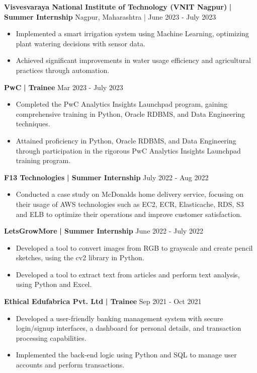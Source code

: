 \documentclass[a4paper]{article}
\begin{document}
      \textbf{Visvesvaraya National Institute of Technology (VNIT Nagpur)}\textbf{ | Summer Internship} \hfill Nagpur, Maharashtra | June 2023 - July 2023\\
          \vspace{-3mm}
\begin{itemize} \itemsep -3pt
\item[] Implemented a smart irrigation system using Machine Learning, optimizing plant watering decisions with sensor data.
\item[] Achieved significant improvements in water usage efficiency and agricultural practices through automation.
\end{itemize}
      \textbf{PwC}\textbf{ | Trainee} \hfill  Mar 2023 - July 2023\\
          \vspace{-3mm}
\begin{itemize} \itemsep -3pt
\item[] Completed the PwC Analytics Insights Launchpad program, gaining comprehensive training in Python, Oracle RDBMS, and Data Engineering techniques.
\item[] Attained proficiency in Python, Oracle RDBMS, and Data Engineering through participation in the rigorous PwC Analytics Insights Launchpad training program.
\end{itemize}
      \textbf{F13 Technologies}\textbf{ | Summer Internship} \hfill  July 2022 - Aug 2022\\
          \vspace{-3mm}
\begin{itemize} \itemsep -3pt
\item[] Conducted a case study on McDonald\textquotesingle{}s home delivery service, focusing on their usage of AWS technologies such as EC2, ECR, Elasticache, RDS, S3 and ELB to optimize their operations and improve customer satisfaction.
\end{itemize}
      \textbf{LetsGrowMore}\textbf{ | Summer Internship} \hfill  June 2022 - July 2022\\
          \vspace{-3mm}
\begin{itemize} \itemsep -3pt
\item[] Developed a tool to convert images from RGB to grayscale and create pencil sketches, using the cv2 library in Python.
\item[] Developed a tool to extract text from articles and perform text analysis, using Python and Excel.
\end{itemize}
      \textbf{Ethical Edufabrica Pvt. Ltd}\textbf{ | Trainee} \hfill  Sep 2021 - Oct 2021\\
          \vspace{-3mm}
\begin{itemize} \itemsep -3pt
\item[] Developed a user-friendly banking management system with secure login/signup interfaces, a dashboard for personal details, and transaction processing capabilities.
\item[] Implemented the back-end logic using Python and SQL to manage user accounts and perform transactions.
\end{itemize}
\end{document}
